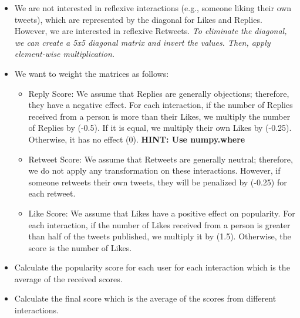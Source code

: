 \documentclass[11pt, a4paper]{article}
\begin{document}
\begin{itemize}
	\item We are not interested in reflexive interactions (e.g., someone liking their own tweets), which are represented by the diagonal for Likes and Replies. However, we are interested in reflexive Retweets.
	\textit{To eliminate the diagonal, we can create a 5x5 diagonal matrix and invert the values. Then, apply element-wise multiplication.}
	\item We want to weight the matrices as follows:
	\begin{itemize}
		\item Reply Score: We assume that Replies are generally objections; therefore, they have a negative effect. For each interaction, if the number of Replies received from a person is more than their Likes, we multiply the number of Replies by (-0.5). If it is equal, we multiply their own Likes by (-0.25). Otherwise, it has no effect (0). \textbf{HINT: Use numpy.where}
		\item Retweet Score: We assume that Retweets are generally neutral; therefore, we do not apply any transformation on these interactions. However, if someone retweets their own tweets, they will be penalized by (-0.25) for each retweet.
		\item Like Score: We assume that Likes have a positive effect on popularity. For each interaction, if the number of Likes received from a person is greater than half of the tweets published, we multiply it by (1.5). Otherwise, the score is the number of Likes.
	\end{itemize}
	\item Calculate the popularity score for each user for each interaction which is the average of the received scores.
	\item Calculate the final score which is the average of the scores from different interactions.
\end{itemize}
\end{document}
